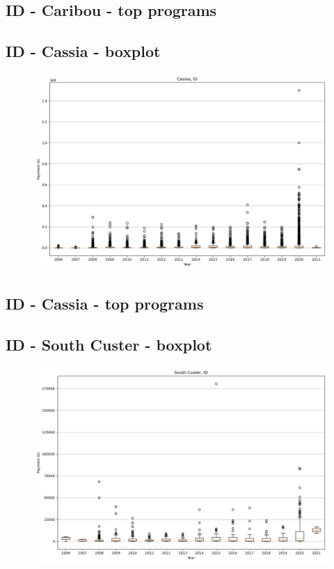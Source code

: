 \subsection*{ID - Caribou - top programs}

\newpage
\subsection*{ID - Cassia - boxplot}
\begin{figure}[h]
\centering
\includegraphics[width=7in]{../output/boxplots/counties/Cassia-ID_boxplot.png}
\end{figure}


\subsection*{ID - Cassia - top programs}

\newpage
\subsection*{ID - South Custer - boxplot}
\begin{figure}[h]
\centering
\includegraphics[width=7in]{../output/boxplots/counties/South Custer-ID_boxplot.png}
\end{figure}


